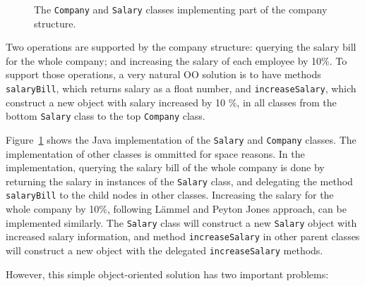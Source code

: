 \begin{figure}[tb]
\vspace{-.1in}
\caption{The \lstinline{Company} and \lstinline{Salary} classes
  implementing part of the company structure.}
\label{oop_company}
\end{figure}

Two operations are supported by the company structure: querying the
salary bill for the whole company; and increasing the salary of each
employee by 10\%. To support those operations, a very natural OO
solution is to have methods \lstinline{salaryBill}, which returns salary as a float number, and
\lstinline{increaseSalary}, which construct a new object with salary increased by 10 \%,
in all classes from the bottom \lstinline{Salary} class to the top \lstinline{Company} class.

Figure~\ref{oop_company} shows the Java implementation of the
\lstinline{Salary} and \lstinline{Company} classes. The implementation
of other classes is ommitted for space reasons.
In the implementation, querying the salary bill of the whole company is done
by returning the salary in instances of the \lstinline{Salary} class,
and delegating the method \lstinline{salaryBill} to the child nodes
in other classes. Increasing the salary for the whole
company by 10\%, following L\"ammel and Peyton Jones approach, can be implemented similarly. The \lstinline{Salary} class will construct a new \lstinline{Salary} object with increased salary information, and method \lstinline{increaseSalary} in other parent classes will construct a new object with the delegated \lstinline{increaseSalary} methods. 

However, this simple object-oriented solution has two important problems:

